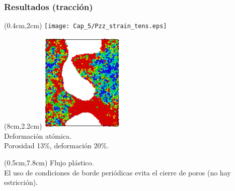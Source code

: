 \begin{frame}
    \frametitle{Resultados (tracci\'on)}
    \begin{textblock*}{7cm}(0.4cm,2cm) %
        \texttt{[image: Cap\_5/Pzz\_strain\_tens.eps]}
    \end{textblock*}
    \begin{textblock*}{4cm}(8cm,2.2cm) %
        \includegraphics[width=4cm]{Presentacion_PANACM_Franco/13_20strain_tens_2.png}\\
        \centering
        \scriptsize{Deformaci\'on at\'omica.\\Porosidad 13\%, deformaci\'on 20\%.}
    \end{textblock*}
    \begin{textblock*}{11.5cm}(0.5cm,7.8cm) %
	\centering
        Flujo pl\'astico.\\
        El uso de condiciones de borde peri\'odicas evita el cierre de poros (no hay estricci\'on).
    \end{textblock*}
\end{frame}

